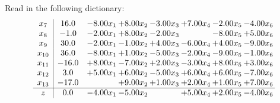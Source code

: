 \documentclass[9pt]{article}
\begin{document}
Read in the following dictionary:
\[\begin{array}{c| c c@{\hskip 2pt} c@{\hskip 2pt} c@{\hskip 2pt} c@{\hskip 2pt} c@{\hskip 2pt} c@{\hskip 2pt} }
 x_{7}   &  16.0 & -8.00 x_{1} & +  8.00 x_{2} & -3.00 x_{3} & +  7.00 x_{4} & -2.00 x_{5} & -4.00 x_{6}\\
 x_{8}   &  -1.0 & -2.00 x_{1} & +  8.00 x_{2} & -2.00 x_{3} &   & -8.00 x_{5} & +  5.00 x_{6}\\
 x_{9}   &  30.0 & -2.00 x_{1} & -1.00 x_{2} & +  4.00 x_{3} & -6.00 x_{4} & +  4.00 x_{5} & -9.00 x_{6}\\
 x_{10}   &  36.0 & -8.00 x_{1} & +  1.00 x_{2} & -5.00 x_{3} & -2.00 x_{4} & -9.00 x_{5} & -1.00 x_{6}\\
 x_{11}   &  -16.0 & +  8.00 x_{1} & -7.00 x_{2} & +  2.00 x_{3} & -3.00 x_{4} & +  8.00 x_{5} & +  3.00 x_{6}\\
 x_{12}   &  3.0 & +  5.00 x_{1} & +  6.00 x_{2} & -5.00 x_{3} & +  6.00 x_{4} & +  6.00 x_{5} & -7.00 x_{6}\\
 x_{13}   &  -17.0  &   & +  9.00 x_{2} & +  1.00 x_{3} & +  2.00 x_{4} & +  1.00 x_{5} & +  7.00 x_{6}\\
\hline
z    &  0.0 & -4.00 x_{1} & -5.00 x_{2} &   & +  5.00 x_{4} & +  2.00 x_{5} & -4.00 x_{6}\\
\end{array}\]
\end{document}
